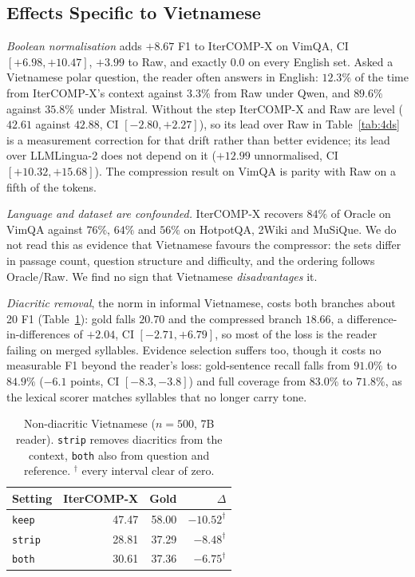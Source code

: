 \documentclass[runningheads]{llncs}
\begin{document}
\subsection{Effects Specific to Vietnamese}
\label{sec:vnfindings}
\emph{Boolean normalisation} adds $+8.67$ F1 to IterCOMP-X on VimQA, CI
$[+6.98,+10.47]$, $+3.99$ to Raw, and exactly $0.0$ on every English set. Asked a
Vietnamese polar question, the reader often answers in English: $12.3\%$ of the
time from IterCOMP-X's context against $3.3\%$ from Raw under Qwen, and $89.6\%$
against $35.8\%$ under Mistral. Without the step IterCOMP-X and Raw are level
($42.61$ against $42.88$, CI $[-2.80,+2.27]$), so its lead over Raw in
Table~\ref{tab:4ds} is a measurement correction for that drift rather than
better evidence; its lead over LLMLingua-2 does not depend on it ($+12.99$
unnormalised, CI $[+10.32,+15.68]$). The compression result on VimQA is parity
with Raw on a fifth of the tokens.

\emph{Language and dataset are confounded.} IterCOMP-X recovers $84\%$ of Oracle
on VimQA against $76\%$, $64\%$ and $56\%$ on HotpotQA, 2Wiki and MuSiQue. We do
not read this as evidence that Vietnamese favours the compressor: the sets differ
in passage count, question structure and difficulty, and the ordering follows
Oracle/Raw. We find no sign that Vietnamese \emph{disadvantages} it.

\emph{Diacritic removal}, the norm in informal Vietnamese, costs both branches
about 20 F1 (Table~\ref{tab:undia}): gold falls $20.70$ and the compressed branch
$18.66$, a difference-in-differences of $+2.04$, CI $[-2.71,+6.79]$, so most of
the loss is the reader failing on merged syllables. Evidence selection suffers
too, though it costs no measurable F1 beyond the reader's loss: gold-sentence
recall falls from $91.0\%$ to $84.9\%$ ($-6.1$ points, CI $[-8.3,-3.8]$) and full
coverage from $83.0\%$ to $71.8\%$, as the lexical scorer matches syllables
that no longer carry tone.

\begin{table}[H]
\centering
\caption{Non-diacritic Vietnamese ($n=500$, 7B reader). \texttt{strip} removes
diacritics from the context, \texttt{both} also from question and reference.
$^\dag$ every interval clear of zero.}
\label{tab:undia}
\small
\setlength{\tabcolsep}{7pt}
\begin{tabular}{lrrr}
\toprule
Setting & IterCOMP-X & Gold & $\Delta$ \\
\midrule
\texttt{keep}  & 47.47 & 58.00 & $-10.52^\dag$ \\
\texttt{strip} & 28.81 & 37.29 & $-8.48^\dag$ \\
\texttt{both}  & 30.61 & 37.36 & $-6.75^\dag$ \\
\bottomrule
\end{tabular}
\end{table}
\end{document}
